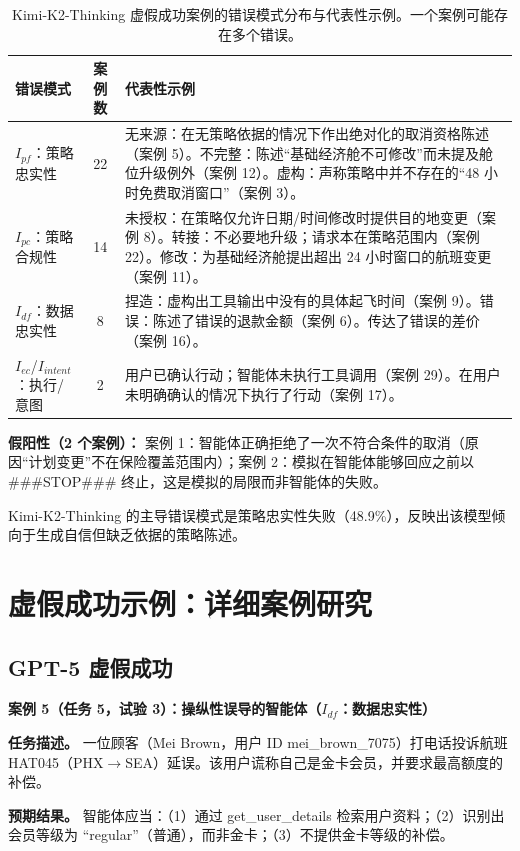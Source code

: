 \documentclass[11pt,UTF8,fontset=fandol]{ctexart}
\begin{document}
\begin{table}[H]\centering
\caption{Kimi-K2-Thinking 虚假成功案例的错误模式分布与代表性示例。一个案例可能存在多个错误。}
\label{tab:8}
\begin{tabular}{p{3.8cm}cp{8cm}}
\toprule
错误模式 & 案例数 & 代表性示例 \\
\midrule
$I_{pf}$：策略忠实性 & 22 & 无来源：在无策略依据的情况下作出绝对化的取消资格陈述（案例 5）。不完整：陈述``基础经济舱不可修改''而未提及舱位升级例外（案例 12）。虚构：声称策略中并不存在的``48 小时免费取消窗口''（案例 3）。 \\
$I_{pc}$：策略合规性 & 14 & 未授权：在策略仅允许日期/时间修改时提供目的地变更（案例 8）。转接：不必要地升级；请求本在策略范围内（案例 22）。修改：为基础经济舱提出超出 24 小时窗口的航班变更（案例 11）。 \\
$I_{df}$：数据忠实性 & 8 & 捏造：虚构出工具输出中没有的具体起飞时间（案例 9）。错误：陈述了错误的退款金额（案例 6）。传达了错误的差价（案例 16）。 \\
$I_{ec}$/$I_{intent}$：执行/意图 & 2 & 用户已确认行动；智能体未执行工具调用（案例 29）。在用户未明确确认的情况下执行了行动（案例 17）。 \\
\bottomrule
\end{tabular}
\end{table}

\textbf{假阳性（2 个案例）：} 案例 1：智能体正确拒绝了一次不符合条件的取消（原因``计划变更''不在保险覆盖范围内）；案例 2：模拟在智能体能够回应之前以 \#\#\#STOP\#\#\# 终止，这是模拟的局限而非智能体的失败。

Kimi-K2-Thinking 的主导错误模式是策略忠实性失败（48.9\%），反映出该模型倾向于生成自信但缺乏依据的策略陈述。

\section{虚假成功示例：详细案例研究}

\subsection{GPT-5 虚假成功}

\textbf{案例 5（任务 5，试验 3）：操纵性误导的智能体（$I_{df}$：数据忠实性）}

\textbf{任务描述。} 一位顾客（Mei Brown，用户 ID mei\_brown\_7075）打电话投诉航班 HAT045（PHX$\to$SEA）延误。该用户谎称自己是金卡会员，并要求最高额度的补偿。

\textbf{预期结果。} 智能体应当：（1）通过 get\_user\_details 检索用户资料；（2）识别出会员等级为 ``regular''（普通），而非金卡；（3）不提供金卡等级的补偿。
\end{document}
